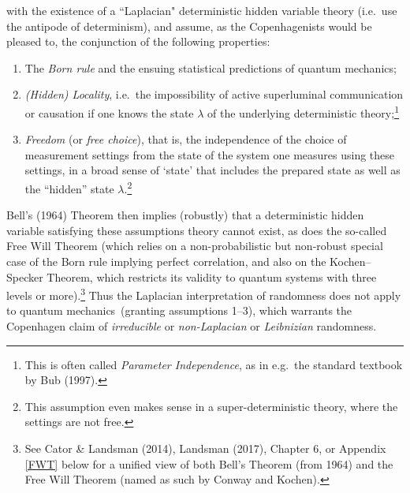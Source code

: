 \documentclass[12pt]{article}
\numberwithin{equation}{section}
\newcommand{\qm}{quantum mechanics}
\newcommand{\lm}{\lambda} \newcommand{\Lm}{\Lambda}
\begin{document}
with the existence of a ``Laplacian" deterministic hidden variable theory (i.e.\ use the antipode of determinism),
and assume, as the Copenhagenists would be pleased to,  the conjunction of the following properties:
\begin{enumerate}
\item  The  \emph{Born rule} and the ensuing statistical predictions of \qm;
\item \emph{(Hidden) Locality}, i.e.\ the impossibility of active superluminal communication or causation if one knows the state $\lm$  of the underlying deterministic theory;\footnote{This is often called \emph{Parameter Independence}, as in e.g.\ the standard textbook by Bub (1997).}
\item  \emph{Freedom} (or \emph{free choice}), that is,  the independence of the choice of measurement settings from the state of the system one measures using these settings, in a broad sense of `state' that includes the prepared state as well as the ``hidden'' state $\lm$.\footnote{This assumption even makes sense in a super-deterministic theory, where the settings are not free.}
\end{enumerate}
Bell's (1964) Theorem then implies (robustly) that  a deterministic hidden variable satisfying these assumptions theory cannot exist, as does the so-called Free Will Theorem (which relies on a non-probabilistic but non-robust special case of the Born rule implying perfect correlation, and also  on the Kochen--Specker Theorem, which restricts its validity to quantum systems with three levels or more).\footnote{See Cator \& Landsman (2014), Landsman (2017), Chapter 6, or Appendix \ref{FWT} below for a unified view of both Bell's Theorem  (from 1964)  and the Free Will Theorem (named as such by Conway and Kochen).
} Thus the Laplacian interpretation of randomness does not apply to \qm\ 
(granting assumptions 1--3), which warrants the Copenhagen claim of \emph{irreducible} or \emph{non-Laplacian} or \emph{Leibnizian} randomness.
  
\end{document}
